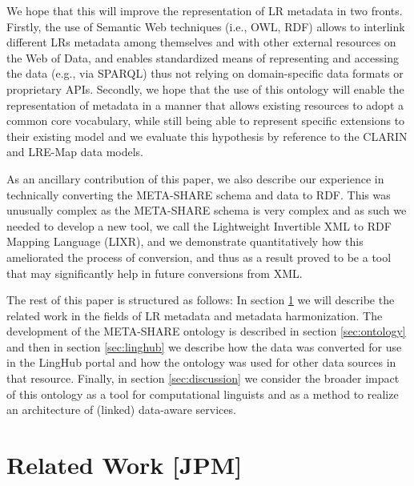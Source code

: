 \documentclass{llncs}
\begin{document}
We hope that this will improve the representation
of LR metadata in two fronts. Firstly, the use of Semantic Web techniques (i.e., OWL, RDF) allows to 
interlink different LRs metadata among themselves and with other external resources on the Web of Data, and enables standardized means of representing and accessing the data (e.g., via SPARQL) thus not relying on domain-specific data formats or proprietary APIs. Secondly, we hope that the use of this ontology will enable the
representation of metadata in a manner that allows existing resources to adopt a
common core vocabulary, while still being able to represent specific extensions
to their existing model and we evaluate this hypothesis by reference to the
CLARIN and LRE-Map data models.



As an ancillary contribution of this paper, we also describe our experience in
technically converting the META-SHARE schema and data to RDF. This was unusually
complex as the META-SHARE schema is very complex and as such we needed to
develop a new tool, we call the Lightweight Invertible XML to RDF Mapping
Language (LIXR), and we demonstrate quantitatively how this ameliorated the
process of conversion, and thus as a result proved to be a tool that may
significantly help in future conversions from XML.

The rest of this paper is structured as follows: In section
\ref{sec:relatedwork} we will describe the related work in the fields of
LR metadata and metadata harmonization. The development of the
META-SHARE ontology is described in section \ref{sec:ontology} and then in
section \ref{sec:linghub} we describe how the data was converted for use in the
LingHub portal and how the ontology was used for other data sources in that
resource. Finally, in section \ref{sec:discussion} we consider the broader
impact of this ontology as a tool for computational linguists and as a method to
realize an architecture of (linked) data-aware services.

\section{Related Work [JPM]}
\label{sec:relatedwork}
\end{document}
